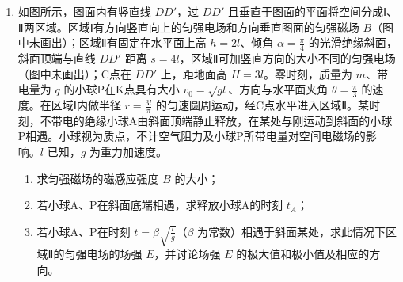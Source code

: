 \documentclass[\gkver]{gaokaozhenti}
\begin{document}
\begin{enumerate}
{\begin{enumerate}
	\item
	$98\Um$

\end{enumerate}
}

\item
如图所示，图面内有竖直线 $DD'$，过 $DD'$ 且垂直于图面的平面将空间分成Ⅰ、Ⅱ两区域。区域Ⅰ有方向竖直向上的匀强电场和方向垂直图面的匀强磁场 $B$（图中未画出）；区域Ⅱ有固定在水平面上高 $h=2l$、倾角 $\alpha=\frac{\pi}{4}$ 的光滑绝缘斜面，斜面顶端与直线 $DD'$ 距离 $s=4l$，区域Ⅱ可加竖直方向的大小不同的匀强电场（图中未画出）；C点在 $DD'$ 上，距地面高 $H=3l$。零时刻，质量为 $m$、带电量为 $q$ 的小球P在K点具有大小 $v_{0}=\sqrt{gl}$、方向与水平面夹角 $\theta=\frac{\pi}{3}$ 的速度。在区域Ⅰ内做半径 $r=\frac{3l}{\pi}$ 的匀速圆周运动，经C点水平进入区域Ⅱ。某时刻，不带电的绝缘小球A由斜面顶端静止释放，在某处与刚运动到斜面的小球P相遇。小球视为质点，不计空气阻力及小球P所带电量对空间电磁场的影响。$l$ 已知，$g$ 为重力加速度。
\begin{enumerate}
	\item
	求匀强磁场的磁感应强度 $B$ 的大小；
	\item
	若小球A、P在斜面底端相遇，求释放小球A的时刻 $t_{A}$；
	\item
	若小球A、P在时刻 $t=\beta\sqrt{\frac{l}{g}}$（$\beta$ 为常数）相遇于斜面某处，求此情况下区域Ⅱ的匀强电场的场强 $E$，并讨论场强 $E$ 的极大值和极小值及相应的方向。
\end{enumerate}
\onepicture[align=right, w=6.93cm]{}

\end{enumerate}
\end{document}
